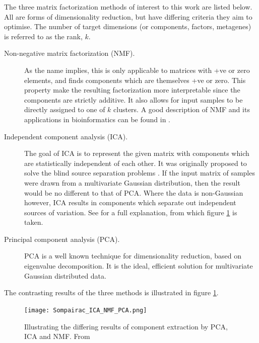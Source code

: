 \documentclass[draft, tikz, 12pt,a4paper,oneside,fleqn]{article}
\begin{document}
The three matrix factorization methods of interest to this work are listed below.  All are forms of dimensionality reduction, but have differing criteria they aim to optimise.  The number of target dimensions (or components, factors, metagenes) is referred to as the rank, $k$.
\begin{description}
\item [Non-negative matrix factorization (NMF).]  
As the name implies, this is only applicable to matrices with +ve or zero elements, and finds components which are themselves +ve or zero.   This property make the resulting factorization more interpretable since the components are strictly additive.   It also allows for input samples to be directly assigned to one of $k$ clusters.   A good description of NMF and its applications in bioinformatics can be found in \cite{Brunet2004}.
%
\item [Independent component analysis (ICA).] The goal of ICA is to represent the given matrix with components which are statistically independent of each other.  It was originally proposed to solve the blind source separation problems \cite{Comon1994}. If the input matrix of samples were drawn from a multivariate Gaussian distribution, then the result would be no different to that of PCA.    Where the data is non-Gaussian however, ICA results in components which separate out independent sources of variation.  See \cite{Sompairac2019} for a full explanation, from which figure \ref{fig-pca-ica-nmp-explanation} is taken.
\item [Principal component analysis (PCA).]  PCA is a well known technique for dimensionality reduction, based on eigenvalue decomposition.  It is the ideal, efficient solution for multivariate Gaussian distributed data.
\end{description}

The contrasting results of the three methods is illustrated in figure \ref{fig-pca-ica-nmp-explanation}.

\begin{figure}[ht]
\begin{center}
\texttt{[image: Sompairac\_ICA\_NMF\_PCA.png]}
\end{center}
\caption{Illustrating the differing results of component extraction by PCA, ICA and NMF.  From \cite{Sompairac2019}}
\label{fig-pca-ica-nmp-explanation}
\end{figure}
\end{document}
